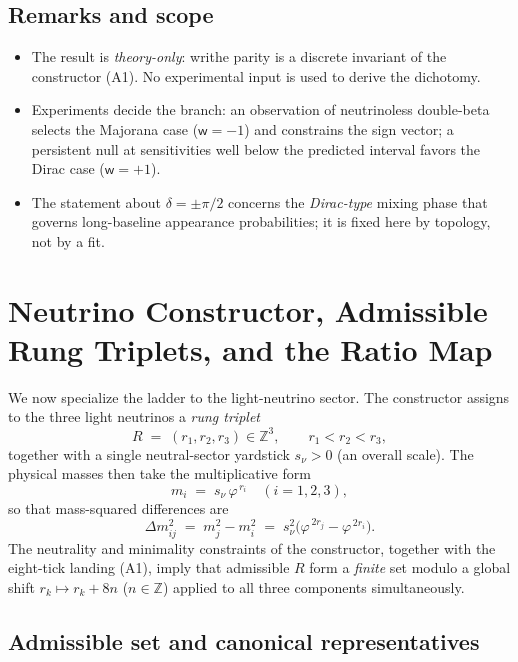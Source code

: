 \documentclass[11pt]{article}
\begin{document}
\subsection*{Remarks and scope}

\begin{itemize}
  \item The result is \emph{theory-only}: writhe parity is a discrete invariant of the constructor (A1). No experimental input is used to derive the dichotomy.
  \item Experiments decide the branch: an observation of neutrinoless double-beta selects the Majorana case ($\mathsf{w}=-1$) and constrains the sign vector; a persistent null at sensitivities well below the predicted interval favors the Dirac case ($\mathsf{w}=+1$).
  \item The statement about $\delta=\pm\pi/2$ concerns the \emph{Dirac-type} mixing phase that governs long-baseline appearance probabilities; it is fixed here by topology, not by a fit.
\end{itemize}

\section{Neutrino Constructor, Admissible Rung Triplets, and the Ratio Map}

We now specialize the ladder to the light-neutrino sector. The constructor assigns to the three light neutrinos a \emph{rung triplet}
\[
R\;=\;(r_1,r_2,r_3)\in\mathbb{Z}^3,\qquad r_1<r_2<r_3,
\]
together with a single neutral-sector yardstick $s_\nu>0$ (an overall scale). The physical masses then take the multiplicative form
\begin{equation}\label{eq:nu-masses}
m_i \;=\; s_\nu\,\varphi^{\,r_i}\quad (i=1,2,3),
\end{equation}
so that mass-squared differences are
\begin{equation}\label{eq:nu-squared}
\Delta m^2_{ij} \;=\; m_j^2-m_i^2 \;=\; s_\nu^2\bigl(\varphi^{\,2r_j}-\varphi^{\,2r_i}\bigr).
\end{equation}
The neutrality and minimality constraints of the constructor, together with the eight-tick landing (A1), imply that admissible $R$ form a \emph{finite} set modulo a global shift $r_k\mapsto r_k+8n$ ($n\in\mathbb{Z}$) applied to all three components simultaneously.

\subsection*{Admissible set and canonical representatives}
\end{document}
